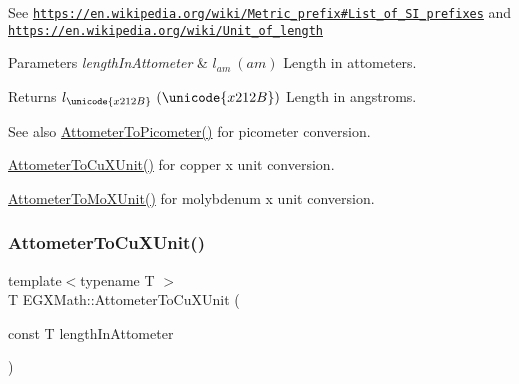 See \href{https://en.wikipedia.org/wiki/Metric_prefix#List_of_SI_prefixes}{\tt https\+://en.\+wikipedia.\+org/wiki/\+Metric\+\_\+prefix\#\+List\+\_\+of\+\_\+\+S\+I\+\_\+prefixes} and \href{https://en.wikipedia.org/wiki/Unit_of_length}{\tt https\+://en.\+wikipedia.\+org/wiki/\+Unit\+\_\+of\+\_\+length} 
\begin{DoxyParams}{Parameters}
{\em length\+In\+Attometer} & $ l_{am}\ (am)$ Length in attometers. \\
\hline
\end{DoxyParams}
\begin{DoxyReturn}{Returns}
$ l_{\unicode{x212B}}\ (\unicode{x212B})$ Length in angstroms. 
\end{DoxyReturn}
\begin{DoxySeeAlso}{See also}
\mbox{\hyperlink{group___e_g_x_math-_conversions-_length_conversions-_s_i-_attometer-_s_i_ga46ccf47b501bffeb16bc792377e55991}{Attometer\+To\+Picometer()}} for picometer conversion. 

\mbox{\hyperlink{group___e_g_x_math-_conversions-_length_conversions-_s_i-_attometer-_non-_s_i_gabd388c2e0821ac9066b4fb87e35402b1}{Attometer\+To\+Cu\+X\+Unit()}} for copper x unit conversion. 

\mbox{\hyperlink{group___e_g_x_math-_conversions-_length_conversions-_s_i-_attometer-_non-_s_i_ga79ec6f4ec4a97af05fe8f69b80805ab7}{Attometer\+To\+Mo\+X\+Unit()}} for molybdenum x unit conversion. 
\end{DoxySeeAlso}
\mbox{\label{group___e_g_x_math-_conversions-_length_conversions-_s_i-_attometer-_non-_s_i_gabd388c2e0821ac9066b4fb87e35402b1}} 
\subsubsection{\texorpdfstring{Attometer\+To\+Cu\+X\+Unit()}{AttometerToCuXUnit()}}
{\footnotesize\ttfamily template$<$typename T $>$ \\
T E\+G\+X\+Math\+::\+Attometer\+To\+Cu\+X\+Unit (\begin{DoxyParamCaption}\item[{const T}]{length\+In\+Attometer }\end{DoxyParamCaption})}



